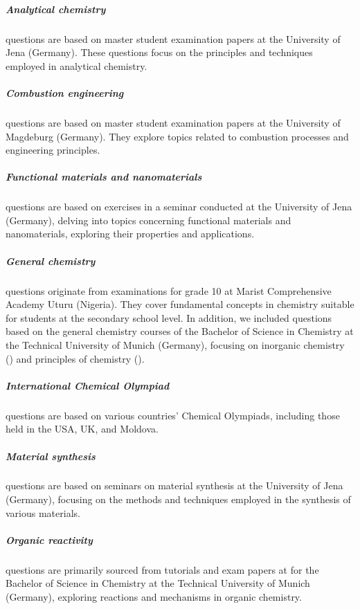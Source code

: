 \documentclass[11pt, oneside]{article}
\begin{document}
\begin{refsection}
\subparagraph{Analytical chemistry}
 questions are based on master student examination papers at the University of Jena (Germany). 
These questions focus on the principles and techniques employed in analytical chemistry.

\subparagraph{Combustion engineering}
 questions are based on master student examination papers at the University of Magdeburg (Germany). 
They explore topics related to combustion processes and engineering principles.

\subparagraph{Functional materials and nanomaterials}
  questions are based on exercises in a seminar conducted at the University of Jena (Germany), delving into topics concerning functional materials and nanomaterials, exploring their properties and applications.

\subparagraph{General chemistry}
 questions originate from examinations for grade 10 at Marist Comprehensive Academy Uturu (Nigeria). 
They cover fundamental concepts in chemistry suitable for students at the secondary school level.
In addition, we included questions based on the general chemistry courses of the Bachelor of Science in Chemistry at the Technical University of Munich (Germany), focusing on inorganic chemistry () and principles of chemistry ().

\subparagraph{International Chemical Olympiad}
 questions are based on various countries' Chemical Olympiads, including those held in the USA, UK, and Moldova.

\subparagraph{Material synthesis}
 questions are based on seminars on material synthesis at the University of Jena (Germany), focusing on the methods and techniques employed in the synthesis of various materials.

\subparagraph{Organic reactivity}
  questions are primarily sourced from tutorials and exam papers at for the Bachelor of Science in Chemistry at the Technical University of Munich (Germany), exploring reactions and mechanisms in organic chemistry.


\end{refsection}
\end{document}
